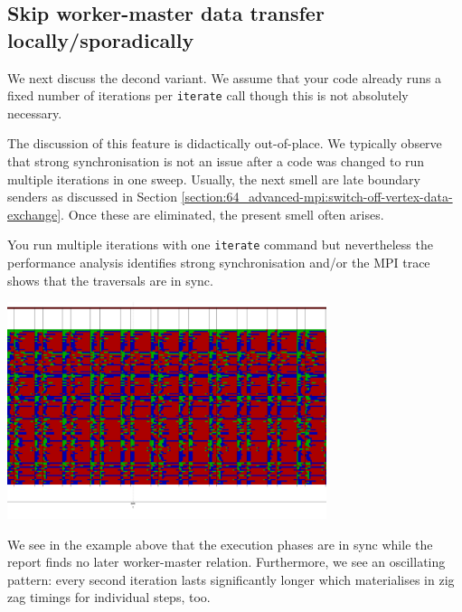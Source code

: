 \subsection{Skip worker-master data transfer locally/sporadically}
\label{section:63_mpi-synchronisation:skip-worker-master}

We next discuss the decond variant.
We assume that your code already runs a fixed number of iterations per
\texttt{iterate} call though this is not absolutely necessary.

\begin{remark}
The discussion of this feature is didactically out-of-place. We typically
observe that strong synchronisation is not an issue after a code was changed to
run multiple iterations in one sweep. Usually, the next smell are late boundary
senders as discussed in Section
\ref{section:64_advanced-mpi:switch-off-vertex-data-exchange}. Once these are
eliminated, the present smell often arises.
\end{remark}


\begin{smell}
You run multiple iterations with one \texttt{iterate} command but nevertheless
the performance analysis identifies strong synchronisation and/or
the MPI trace shows that the traversals are in sync.
\end{smell}

\begin{center}
  \includegraphics[width=0.7\textwidth]{63_mpi-synchronisation/no-skip-of-reduction.png}
\end{center}

\noindent
We see in the example above that the execution phases are in sync while the
report finds no later worker-master relation. 
Furthermore, we see an oscillating pattern: every second iteration lasts
significantly longer which materialises in zig zag timings for individual steps,
too.

